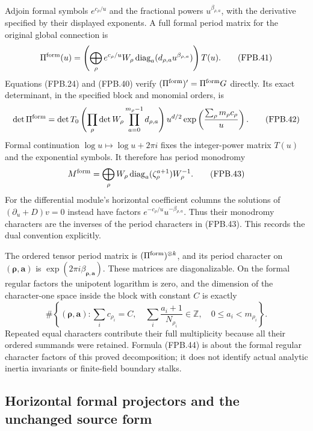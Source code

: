 Adjoin formal symbols \(e^{c_\rho/u}\) and the fractional powers
\(u^{\beta_{\rho,a}}\), with the derivative specified by their
displayed exponents. A full formal period matrix for the original
global connection is
\[
 \Pi^{\rm form}(u)=
   \left(\bigoplus_\rho
       e^{c_\rho/u}W_\rho
            \operatorname{diag}_a(d_{\rho,a}u^{\beta_{\rho,a}})
   \right)T(u).
 \tag{FPB.41}\label{GraphV2:eq:fpb-formal-period}
\]
Equations (FPB.24) and (FPB.40) verify
\((\Pi^{\rm form})'=\Pi^{\rm form}G\) directly. Its exact
determinant, in the specified block and monomial orders, is
\[
 \det\Pi^{\rm form}
   =\det T_0\left(\prod_\rho\det W_\rho
                              \prod_{a=0}^{m_\rho-1}d_{\rho,a}\right)
          u^{d/2}\exp\left(\frac{\sum_\rho m_\rho c_\rho}{u}\right).
 \tag{FPB.42}\label{GraphV2:eq:fpb-period-det}
\]
Formal continuation \(\log u\mapsto\log u+2\pi i\) fixes the
integer-power matrix \(T(u)\) and the exponential symbols. It
therefore has period monodromy
\[
 M^{\rm form}=\bigoplus_\rho
    W_\rho\operatorname{diag}_a(\zeta_\rho^{a+1})W_\rho^{-1}.
 \tag{FPB.43}\label{GraphV2:eq:fpb-formal-monodromy}
\]
For the differential module's horizontal coefficient columns the
solutions of \((\partial_u+D)v=0\) instead have factors
\(e^{-c_\rho/u}u^{-\beta_{\rho,a}}\). Thus their monodromy
characters are the inverses of the period characters in (FPB.43).
This records the dual convention explicitly.

The ordered tensor period matrix is
\((\Pi^{\rm form})^{\otimes k}\), and its period character on
\((\boldsymbol\rho,\boldsymbol a)\) is
\(\exp(2\pi i\beta_{\boldsymbol\rho,\boldsymbol a})\).
These matrices are diagonalizable. On the formal regular factors the
unipotent logarithm is zero, and the dimension of the character-one
space inside the block with constant \(C\) is exactly
\[
 \#\left\{(\boldsymbol\rho,\boldsymbol a):
    \sum_i c_{\rho_i}=C,\quad
    \sum_i\frac{a_i+1}{N_{\rho_i}}\in\mathbb Z,\quad
    0\le a_i<m_{\rho_i}\right\}.
 \tag{FPB.44}\label{GraphV2:eq:fpb-formal-invariants}
\]
Repeated equal characters contribute their full multiplicity because
all their ordered summands were retained. Formula (FPB.44) is about
the formal regular character factors of this proved decomposition;
it does not identify actual analytic inertia invariants or finite-field
boundary stalks.

\subsection{Horizontal formal projectors and the unchanged source form}

